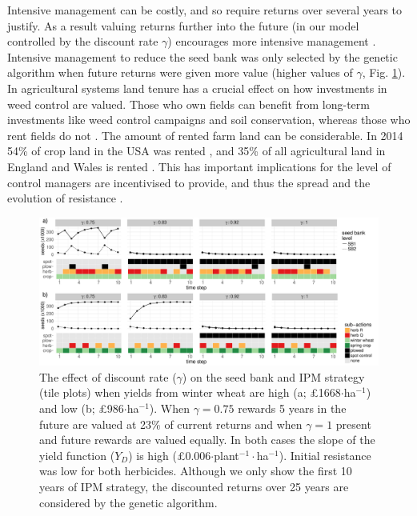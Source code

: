 \documentclass[12pt, a4paper]{article}
\begin{document}
Intensive management can be costly, and so require returns over several years to justify. As a result valuing returns further into the future (in our model controlled by the discount rate $\gamma$) encourages more intensive management \citep{EpanN2010}. Intensive management to reduce the seed bank was only selected by the genetic algorithm when future returns were given more value (higher values of $\gamma$, Fig. \ref{fig:dis_rate}). In agricultural systems land tenure has a crucial effect on how investments in weed control are valued. Those who own fields can benefit from long-term investments like weed control campaigns and soil conservation, whereas those who rent fields do not \citep{Wies1996, Fras2004}. The amount of rented farm land can be considerable. In 2014 54\% of crop land in the USA was rented \citep{Bige2016}, and 35\% of all agricultural land in England and Wales is rented \citep{CAAV2017}. This has important implications for the level of control managers are incentivised to provide, and thus the spread and the evolution of resistance \citep{Mare2012}.       
\begin{figure}
	\includegraphics[width=178mm]{MS_figs/dis_rate_SB_strat.pdf}
	\caption{The effect of discount rate ($\gamma$) on the seed bank and IPM strategy (tile plots) when yields from winter wheat are high (a; \pounds 1668$\cdot$ha$^{-1}$) and low (b; \pounds 986$\cdot$ha$^{-1}$). When $\gamma = 0.75$ rewards 5 years in the future are valued at 23\% of current returns and when $\gamma = 1$ present and future rewards are valued equally. In both cases the slope of the yield function ($Y_D$) is high (\pounds 0.006$\cdot$plant$^{-1}\cdot$ha$^{-1}$). Initial resistance was low for both herbicides. Although we only show the first 10 years of IPM strategy, the discounted returns over 25 years are considered by the genetic algorithm.}
	\label{fig:dis_rate} 
\end{figure}
\end{document}

